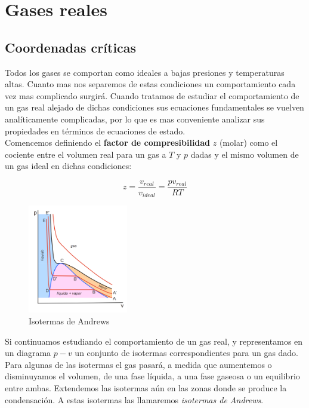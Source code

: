 \documentclass[12pt,a4paper,oneside]{book}
\begin{document}
\chapter{Gases reales}

\section{Coordenadas críticas}

Todos los gases se comportan como ideales a bajas presiones y temperaturas altas. Cuanto mas nos separemos de estas condiciones un comportamiento cada vez mas complicado surgirá. Cuando tratamos de estudiar el comportamiento de un gas real alejado de dichas condiciones sus ecuaciones fundamentales se vuelven analíticamente complicadas, por lo que es mas conveniente analizar sus propiedades en términos de ecuaciones de estado.\\

Comencemos definiendo el \textbf{factor de compresibilidad} $z$ (molar) como el cociente entre el volumen real para un gas a $T$ y $p$ dadas y el mismo volumen de un gas ideal en dichas condiciones:

\begin{equation}
z = \dfrac{v_{real}}{v_{ideal}} = \dfrac{p v_{real}}{RT}
\end{equation}


\begin{figure}[h!]
    \centering
    \includegraphics[width=0.39\textwidth]{isotermas-andrews.png}
    \caption{Isotermas de Andrews}
\end{figure}


Si continuamos estudiando el comportamiento de un gas real, y representamos en  un diagrama $p-v$ un conjunto de isotermas correspondientes para un gas dado. Para algunas de las isotermas el gas pasará, a medida que aumentemos o disminuyamos el volumen, de una fase líquida, a una fase gaseosa o un equilibrio entre ambas. Extendemos las isotermas aún en las zonas donde se produce la condensación. A estas isotermas las llamaremos \textit{isotermas de Andrews}. \\
\end{document}
